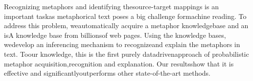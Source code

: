 Recognizing metaphors and identifying thesource-target mappings is an important taskas metaphorical text poses a big challenge formachine reading. To address this problem, weautomatically acquire a metaphor knowledgebase and an isA knowledge base from billionsof web pages. Using the knowledge bases, wedevelop an inferencing mechanism to recognizeand explain the metaphors in text. Toour knowledge, this is the first purely datadrivenapproach of probabilistic metaphor acquisition,recognition and explanation. Our resultsshow that it is effective and significantlyoutperforms other state-of-the-art methods.
